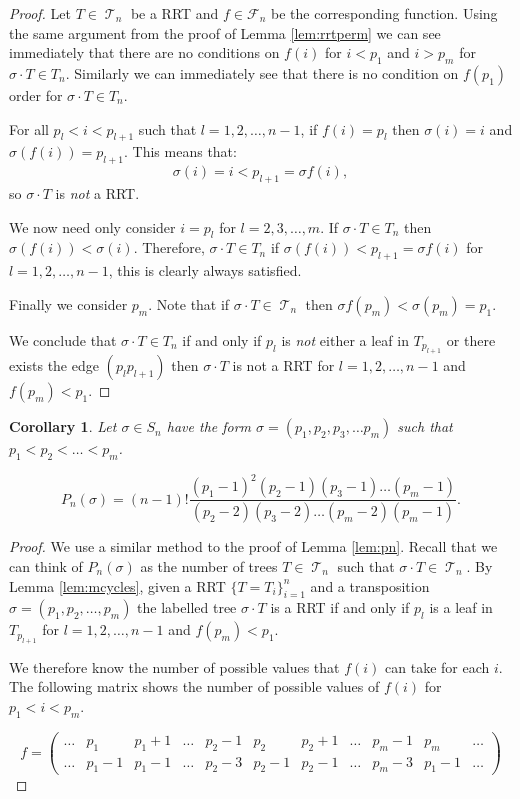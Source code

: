 \documentclass[10pt]{amsart} %
\newtheorem{corol}{Corollary}
\theoremstyle{definition}
\DeclareMathOperator{\T}{\mathcal{T}}
\begin{document}
\begin{proof}
Let $T \in \T_n$ be a RRT and $f \in \mathcal{F}_n$ be the corresponding function.  Using the same argument from the proof of Lemma \ref{lem:rrtperm} we can see immediately that there are no conditions on $f(i)$ for $i < p_1$ and $i > p_m$ for $\sigma \cdot T \in T_n$.  Similarly we can immediately see that there is no condition on $f(p_1)$ order for $\sigma \cdot T \in T_n$.

For all $p_l < i < p_{l+1}$ such that $l = 1,2,\dots, n-1$, if $f(i) = p_l$ then $\sigma(i) = i$ and $\sigma(f(i)) = p_{l+1}$.  This means that:
\[\sigma(i) = i < p_{l+1}  = \sigma{f(i)},\]
so $\sigma \cdot T$ is \emph{not} a RRT.  %

We now need only consider $i = p_l$ for $l = 2,3,\dots,m$.  If $\sigma \cdot T \in T_n$ then $\sigma(f(i)) < \sigma(i)$. Therefore, $\sigma \cdot T \in T_n$ if $\sigma(f(i)) < p_{l+1}  = \sigma{f(i)}$ for  $l = 1,2,\dots, n-1$, this is clearly always satisfied.

Finally we consider $p_m$.  Note that if $\sigma \cdot T \in \T_n$ then $\sigma f(p_{m}) < \sigma(p_m) = p_1$. 

We conclude that $\sigma \cdot T \in T_n$ if and only if $p_l$ is \emph{not} either a leaf in $T_{p_{l+1}}$ or there exists the edge $(p_lp_{l+1})$ then $\sigma \cdot T$ is not a RRT for $l = 1,2,\dots, n-1$ and $f(p_m) < p_1$.
\end{proof}
\begin{corol}
  Let $\sigma \in S_n$ have the form $\sigma = (p_1,p_2,p_3,\dots p_m)$ such that $p_1 < p_2 < \dots < p_m$.  
  
  \[P_n(\sigma) = (n-1)!\frac{(p_1-1)^{2}(p_2 -1)(p_3-1)\dots(p_m -1)}{(p_2 - 2)(p_3 - 2)\dots(p_m-2)(p_m-1)}.\] 

  \end{corol}
\begin{proof}
 We use a similar method to the proof of Lemma \ref{lem:pn}.  Recall that we can think of $P_n(\sigma)$  as the number of trees $T \in \T_n$ such that $\sigma \cdot T \in \T_n$. By Lemma \ref{lem:mcycles}, given a RRT $\{T = T_{i}\}_{i=1}^{n}$ and a transposition $\sigma  = (p_1,p_2,\dots,p_m)$ the labelled tree $\sigma  \cdot T$ is a RRT if and only if  $p_l$ is a leaf in $T_{p_{l+1}}$ for $l = 1,2,\dots,n-1$ and $f(p_m) < p_1$.  

We therefore know the number of possible values that $f(i)$ can take for each $i$. The following matrix shows the number of possible values of $f(i)$ for $p_1 < i < p_m$. 

 \[ f = \left(\begin{array}{ccccccccccc}
     \dots & p_1      & p_1 +1   & \dots & p_2 - 1 & p_2   & p_2 + 1 & \dots & p_m - 1 & p_m & \dots \\
     \dots & p_1 - 1  & p_1 - 1  & \dots & p_2 - 3 & p_2-1 & p_2-1   & \dots & p_m-3   & p_1-1 & \dots  
    \end{array} \right)
\]
\end{proof}
 
\end{document}
